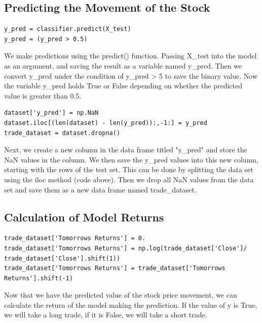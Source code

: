 \documentclass{article}
\begin{document}
\subsection{Predicting the Movement of the Stock}
\begin{verbatim}
y_pred = classifier.predict(X_test)
y_pred = (y_pred > 0.5)
\end{verbatim}
We make predictions using the predict() function. Passing X\_test into the model as an argument, and saving the result as a variable named y\_pred. Then we convert y\_pred under the condition of y\_pred > 5 to save the binary value. Now the variable y\_pred holds True or False depending on whether the predicted value is greater than 0.5.
\begin{verbatim}
dataset['y_pred'] = np.NaN
dataset.iloc[(len(dataset) - len(y_pred)):,-1:] = y_pred
trade_dataset = dataset.dropna()
\end{verbatim}
Next, we create a new column in the data frame titled "y\_pred" and store the NaN values in the column. We then save the y\_pred values into this new column, starting with the rows of the test set. This can be done by splitting the data set using the iloc method (code above). Then we drop all NaN values from the data set and save them as a new data frame named trade\_dataset.

\subsection{Calculation of Model Returns}
\begin{verbatim}
trade_dataset['Tomorrows Returns'] = 0.
trade_dataset['Tomorrows Returns'] = np.log(trade_dataset['Close']/
trade_dataset['Close'].shift(1))
trade_dataset['Tomorrows Returns'] = trade_dataset['Tomorrows Returns'].shift(-1)
\end{verbatim}
Now that we have the predicted value of the stock price movement, we can calculate the return of the model making the prediction. If the value of y is True, we will take a long trade, if it is False, we will take a short trade.
\end{document}
